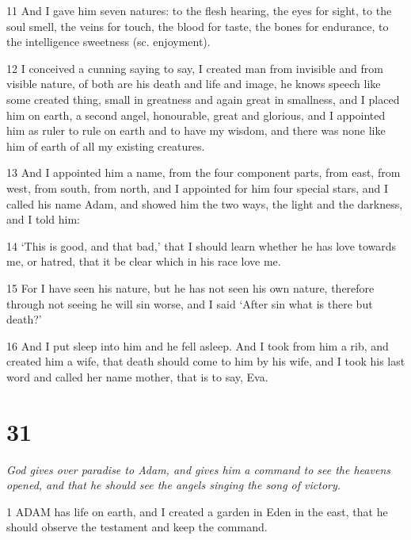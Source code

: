 \par 11 And I gave him seven natures: to the flesh hearing, the eyes for sight, to the soul smell, the veins for touch, the blood for taste, the bones for endurance, to the intelligence sweetness (sc. enjoyment).

\par 12 I conceived a cunning saying to say, I created man from invisible and from visible nature, of both are his death and life and image, he knows speech like some created thing, small in greatness and again great in smallness, and I placed him on earth, a second angel, honourable, great and glorious, and I appointed him as ruler to rule on earth and to have my wisdom, and there was none like him of earth of all my existing creatures.

\par 13 And I appointed him a name, from the four component parts, from east, from west, from south, from north, and I appointed for him four special stars, and I called his name Adam, and showed him the two ways, the light and the darkness, and I told him:

\par 14 ‘This is good, and that bad,’ that I should learn whether he has love towards me, or hatred, that it be clear which in his race love me.

\par 15 For I have seen his nature, but he has not seen his own nature, therefore through not seeing he will sin worse, and I said ‘After sin what is there but death?’

\par 16 And I put sleep into him and he fell asleep. And I took from him a rib, and created him a wife, that death should come to him by his wife, and I took his last word and called her name mother, that is to say, Eva.

\chapter{31}

\par \textit{God gives over paradise to Adam, and gives him a command to see the heavens opened, and that he should see the angels singing the song of victory.}

\par 1 ADAM has life on earth, and I created a garden in Eden in the east, that he should observe the testament and keep the command.

